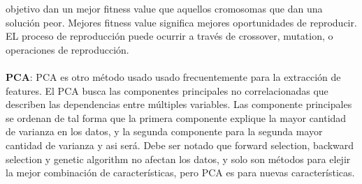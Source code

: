 objetivo dan un mejor fitness value que aquellos cromosomas que dan una solución peor. Mejores fitness value significa mejores oportunidades de reproducir. EL proceso 
de reproducción puede ocurrir a través de crossover, mutation, o operaciones de reproducción. 
\\\\
\textbf{PCA}: PCA es otro método usado usado frecuentemente para la extracción de features. El PCA busca las componentes principales no correlacionadas que describen 
las dependencias entre múltiples variables. Las componente principales se ordenan de tal forma que la primera componente explique la mayor cantidad de varianza en los
datos, y la segunda componente para la segunda mayor cantidad de varianza y asi será.  Debe ser notado que forward selection, backward selection y genetic algorithm 
no afectan los datos, y solo son métodos para elejir la mejor combinación de características, pero PCA es para nuevas características. 
